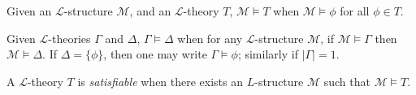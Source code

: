\documentclass[a4paper]{article}
\begin{document}
{    Given an \(\mathcal  L\)-structure \(\mathcal  M\), and an \(\mathcal  L\)-theory \(T\),
    \(\mathcal  M \vDash  T\) when \(\mathcal  M \vDash \phi\) for all \(\phi \in  T\).
}\par{
    Given \(\mathcal  L\)-theories \(\Gamma\) and \(\Delta\), \(\Gamma \vDash \Delta\)
    when for any \(\mathcal  L\)-structure \(\mathcal  M\), if \(\mathcal  M \vDash \Gamma\)
    then \(\mathcal  M \vDash \Delta\).
    If \(\Delta = \{ \phi \}\), then one may write \(\Gamma \vDash \phi\); similarly if \(| \Gamma |=1\).
}\par{
    A \(\mathcal  L\)-theory \(T\) is \emph{satisfiable} when there exists an \(L\)-structure \(\mathcal  M\)
    such that \(\mathcal  M \vDash  T\).
}
\printbibliography
\end{document}
